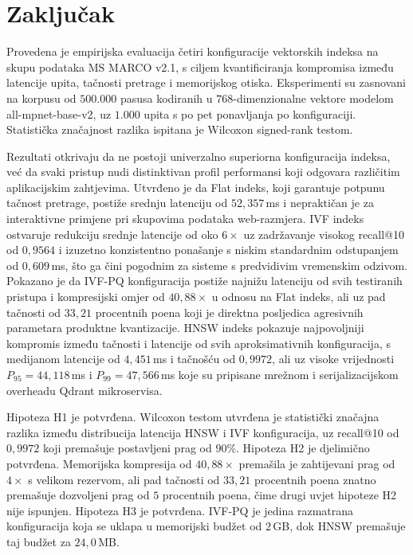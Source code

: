\section{Zaključak}
\label{sec:zakljucak}

Provedena je empirijska evaluacija četiri konfiguracije
vektorskih indeksa na skupu podataka
\foreignlanguage{english}{MS MARCO v2.1}, s ciljem
kvantificiranja kompromisa između latencije upita,
tačnosti pretrage i memorijskog otiska.
Eksperimenti su zasnovani na korpusu od $500{.}000$
pasusa kodiranih u $768$-dimenzionalne vektore
modelom \foreignlanguage{english}{all-mpnet-base-v2},
uz $1{.}000$ upita s po pet ponavljanja po
konfiguraciji.
Statistička značajnost razlika ispitana je
Wilcoxon \foreignlanguage{english}{signed-rank}
testom.

Rezultati otkrivaju da ne postoji univerzalno
superiorna konfiguracija indeksa, već da svaki
pristup nudi distinktivan profil performansi koji
odgovara različitim aplikacijskim zahtjevima.
Utvrđeno je da \foreignlanguage{english}{Flat}
indeks, koji garantuje potpunu tačnost pretrage,
postiže srednju latenciju od $52{,}357$\,ms i
nepraktičan je za interaktivne primjene pri
skupovima podataka web-razmjera.
\foreignlanguage{english}{IVF} indeks ostvaruje
redukciju srednje latencije od oko $6\times$ uz
zadržavanje visokog
\foreignlanguage{english}{recall@10} od $0{,}9564$
i izuzetno konzistentno ponašanje s niskim
standardnim odstupanjem od $0{,}609$\,ms, što ga
čini pogodnim za sisteme s predvidivim vremenskim
odzivom.
Pokazano je da
\foreignlanguage{english}{IVF-PQ} konfiguracija
postiže najnižu latenciju od svih testiranih
pristupa i kompresijski omjer od $40{,}88\times$
u odnosu na \foreignlanguage{english}{Flat} indeks,
ali uz pad tačnosti od $33{,}21$ procentnih poena
koji je direktna posljedica agresivnih parametara
produktne kvantizacije.
\foreignlanguage{english}{HNSW} indeks pokazuje
najpovoljniji kompromis između tačnosti i latencije
od svih aproksimativnih konfiguracija, s medijanom
latencije od $4{,}451$\,ms i tačnošću od $0{,}9972$,
ali uz visoke vrijednosti $P_{95} = 44{,}118$\,ms
i $P_{99} = 47{,}566$\,ms koje su pripisane mrežnom
i serijalizacijskom overheadu
\foreignlanguage{english}{Qdrant} mikroservisa.

Hipoteza H1 je potvrđena.
Wilcoxon testom utvrđena je statistički značajna
razlika između distribucija latencija
\foreignlanguage{english}{HNSW} i
\foreignlanguage{english}{IVF} konfiguracija,
uz \foreignlanguage{english}{recall@10} od $0{,}9972$
koji premašuje postavljeni prag od $90\%$.
Hipoteza H2 je djelimično potvrđena.
Memorijska kompresija od $40{,}88\times$ premašila
je zahtijevani prag od $4\times$ s velikom rezervom,
ali pad tačnosti od $33{,}21$ procentnih poena
znatno premašuje dozvoljeni prag od $5$ procentnih
poena, čime drugi uvjet hipoteze H2 nije ispunjen.
Hipoteza H3 je potvrđena.
\foreignlanguage{english}{IVF-PQ} je jedina
razmatrana konfiguracija koja se uklapa u memorijski
budžet od $2$\,GB, dok
\foreignlanguage{english}{HNSW} premašuje taj budžet
za $24{,}0$\,MB.


